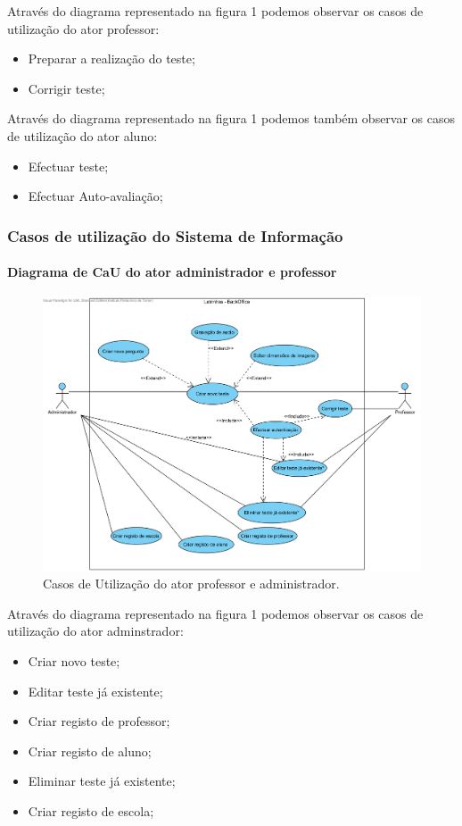 \documentclass[a4paper]{article}
\begin{document}
			Através do diagrama representado na figura 1 podemos observar os casos de utilização do ator professor:
			\begin{itemize}
			\item	Preparar a realização do teste;
			\item   Corrigir teste;
			\end{itemize}
			
			Através do diagrama representado na figura 1 podemos também observar os casos de utilização do ator aluno:
			\begin{itemize}
				\item	Efectuar teste;
				\item   Efectuar Auto-avaliação;
			\end{itemize}
			\newpage
			\subsubsection{Casos de utilização do Sistema de Informação}
						
			\paragraph{Diagrama de CaU do ator administrador e professor}
			
			\begin{figure}[h]
				\centering
				\includegraphics[width=0.8\linewidth]{./diagramasAnaliseSistemas/BackOffice}
				\caption{Casos de Utilização do ator professor e administrador.}
				\label{fig:BackOffice}
			\end{figure}
			Através do diagrama representado na figura 1 podemos observar os casos de utilização do ator adminstrador:
			\begin{itemize}
			\item	Criar novo teste;
			\item   Editar teste já existente;
			\item   Criar registo de professor;
			\item   Criar registo de aluno;
			\item 	Eliminar teste já existente;
			\item   Criar registo de escola;
			\end{itemize}
			
\end{document}
